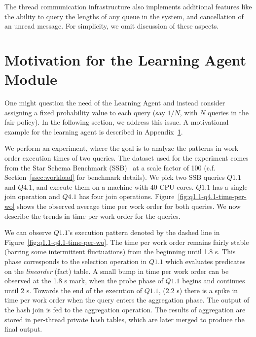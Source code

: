 The thread communication infrastructure also implements additional features 
like the ability to query the lengths of any queue in the system, and cancellation 
of an unread message. 
For simplicity, we omit discussion of these aspects. 
\section{Motivation for the Learning Agent Module}\label{apx:learning-motivation}
One might question the need of the Learning Agent and instead consider assigning a fixed probability value to each query (say $1/N$, with $N$ queries in the fair policy).
In the following section, we address this issue. 
A motivational example for the learning agent is described in Appendix~\ref{apx:learning-motivation}.

We perform an experiment, where the goal is to analyze the patterns in work order execution times of two queries. 
The dataset used for the experiment comes from the Star Schema Benchmark (SSB)~\cite{ssb} 
at a scale factor of 100 (c.f. Section~\ref{ssec:workload} for benchmark details).
We pick two SSB queries $Q1.1$ and $Q4.1$, and execute them on a machine with 40 CPU cores. 
$Q1.1$ has a single join operation and $Q4.1$ has four join operations.
Figure~\ref{fig:q1.1-q4.1-time-per-wo} shows the observed average time per work order for both queries.
We now describe the trends in time per work order for the queries.

We can observe $Q1.1$'s execution pattern denoted by the dashed line in Figure~\ref{fig:q1.1-q4.1-time-per-wo}. 
The time per work order remains fairly stable (barring some intermittent fluctuations) from the beginning until 1.8 s.
This phase corresponds to the selection operation in $Q1.1$ which evaluates predicates on the \textit{lineorder} (fact) table.
A small bump in time per work order can be observed at the 1.8 s mark, when the probe phase of $Q1.1$ begins and continues until 2 s.
Towards the end of the execution of $Q1.1$, (2.2 s) there is a spike in time per work order when the query enters the aggregation phase. 
The output of the hash join is fed to the aggregation operation. 
The results of aggregation are stored in per-thread private hash tables, which are later merged to produce the final output.

